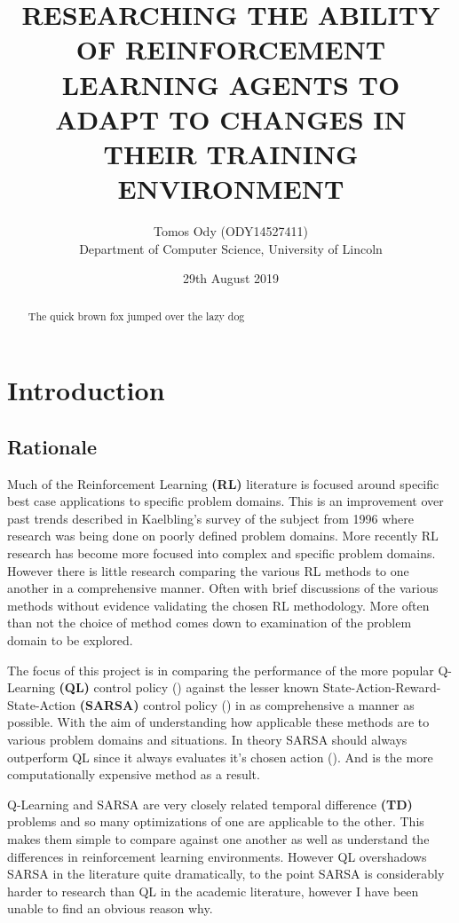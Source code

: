 \documentclass[10pt,journal]{IEEEtran}
\title{\textbf{RESEARCHING THE ABILITY OF REINFORCEMENT LEARNING AGENTS TO ADAPT TO CHANGES IN THEIR TRAINING ENVIRONMENT}\\}
\author{Tomos Ody (ODY14527411)\\Department of Computer Science, University of Lincoln}
\date{29th August 2019}
\begin{document}
\maketitle

\begin{abstract}
  The quick brown fox jumped over the lazy dog \lipsum[1]
\end{abstract}

\section{Introduction}

\subsection{Rationale}
Much of the Reinforcement Learning \textbf{(RL)} literature is focused around specific best case applications to specific problem domains. This is an improvement over past trends described in Kaelbling's survey of the subject from 1996 \cite{Kaelbling} where research was being done on poorly defined problem domains. More recently RL research has become more focused into complex and specific problem domains. However there is little research comparing the various RL methods to one another in a comprehensive manner. Often with brief discussions of the various methods without evidence validating the chosen RL methodology. More often than not the choice of method comes down to examination of the problem domain to be explored.

The focus of this project is in comparing the performance of the more popular Q-Learning \textbf{(QL)}  control policy (\cite{Watkins92}) against the lesser known State-Action-Reward-State-Action \textbf{(SARSA)} control policy (\cite{Rummery}) in as comprehensive a manner as possible. With the aim of understanding how applicable these methods are to various problem domains and situations. In theory SARSA should always outperform QL since it always evaluates it’s chosen action (\cite{Sutton}). And is the more computationally expensive method as a result.

Q-Learning and SARSA are very closely related temporal difference \textbf{(TD)} problems and so many optimizations of one are applicable to the other. This makes them simple to compare against one another as well as understand the differences in reinforcement learning environments. However QL overshadows SARSA in the literature quite dramatically, to the point SARSA is considerably harder to research than QL in the academic literature, however I have been unable to find an obvious reason why.
\end{document}
